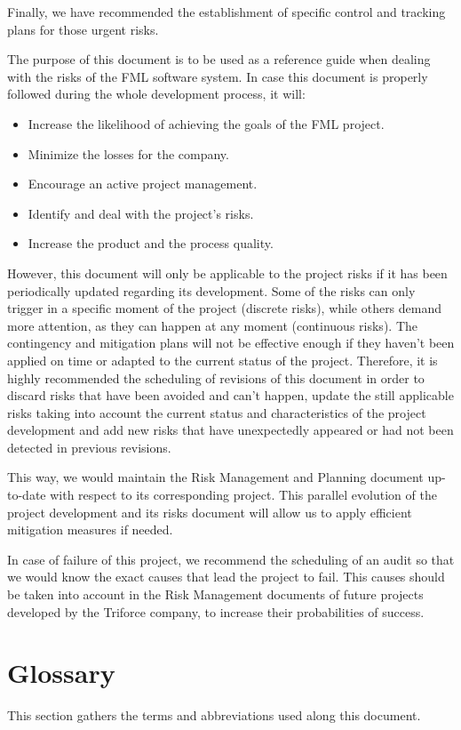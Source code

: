 \documentclass[11pt]{report}
\newcounter{risks}[subsection]
\begin{document}
Finally, we have recommended the establishment of specific control and tracking plans for those urgent risks.

The purpose of this document is to be used as a reference guide when dealing with the risks of the FML software system. In case this document is properly followed during the whole development process, it will:

\begin{itemize}
\item Increase the likelihood of achieving the goals of the FML project.
\item Minimize the losses for the company.
\item Encourage an active project management.
\item Identify and deal with the project's risks.
\item Increase the product and the process quality.
\end{itemize}

However, this document will only be applicable to the project risks if it has been periodically updated regarding its development. Some of the risks can only trigger in a specific moment of the project (discrete risks), while others demand more attention, as they can happen at any moment (continuous risks). The contingency and mitigation plans will not be effective enough if they haven't been applied on time or adapted to the current status of the project. Therefore, it is highly recommended the scheduling of revisions of this document in order to discard risks that have been avoided and can't happen, update the still applicable risks taking into account the current status and characteristics of the project development and add new risks that have unexpectedly appeared or had not been detected in previous revisions.

This way, we would maintain the Risk Management and Planning document up-to-date with respect to its corresponding project. This parallel evolution of the project development and its risks document will allow us to apply efficient mitigation measures if needed.

In case of failure of this project, we recommend the scheduling of an audit so that we would know the exact causes that lead the project to fail. This causes should be taken into account in the Risk Management documents of future projects developed by the Triforce company, to increase their probabilities of success.
\appendix

\chapter{Glossary}
\label{chapGlossary}
This section gathers the terms and abbreviations used along this document.
\end{document}

